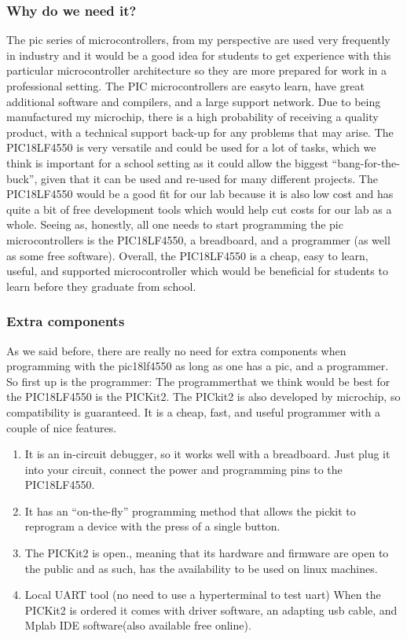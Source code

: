 \documentclass[12pt]{article}
\begin{document}
\subsubsection{Why do we need it?}

The pic series of microcontrollers, from my perspective are used very frequently in industry and it
would be a good idea for students to get experience with this particular microcontroller architecture
so they are more prepared for work in a professional setting. The PIC microcontrollers are easyto learn, have great additional software and compilers, and a large support network. Due to being
manufactured my microchip, there is a high probability of receiving a quality product, with a
technical support back-up for any problems that may arise.
The PIC18LF4550 is very versatile and could be used for a lot of tasks, which we think is important
for a school setting as it could allow the biggest “bang-for-the-buck”, given that it can be used and
re-used for many different projects. The PIC18LF4550 would be a good fit for our lab because it
is also low cost and has quite a bit of free development tools which would help cut costs for our lab
as a whole. Seeing as, honestly, all one needs to start programming the pic microcontrollers is the
PIC18LF4550, a breadboard, and a programmer (as well as some free software).
Overall, the PIC18LF4550 is a cheap, easy to learn, useful, and supported microcontroller which
would be beneficial for students to learn before they graduate from school.
\subsubsection{Extra components}
As we said before, there are really no need for extra components when programming with the
pic18lf4550 as long as one has a pic, and a programmer.
So first up is the programmer:
The programmerthat we think would be best for the PIC18LF4550 is the PICKit2.
The PICkit2 is also developed by microchip, so compatibility is guaranteed. It is a cheap, fast, and
useful programmer with a couple of nice features.

\begin{enumerate}
\item It is an in-circuit debugger, so it works well with a breadboard. Just plug it into your circuit,
connect the power and programming pins to the PIC18LF4550.
\item It has an “on-the-fly” programming method that allows the pickit to reprogram a device with the
press of a single button.
\item The PICKit2 is open., meaning that its hardware and firmware are open to the public and as such,
has the availability to be used on linux machines.
\item Local UART tool (no need to use a hyperterminal to test uart)
When the PICKit2 is ordered it comes with driver software, an adapting usb cable, and Mplab IDE
software(also available free online).
\end{enumerate}
\end{document}
